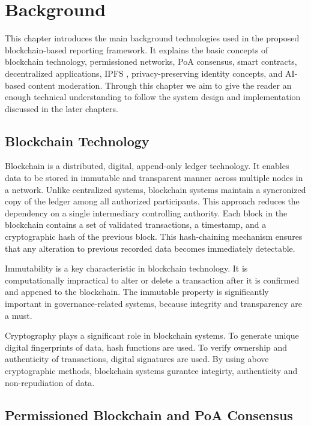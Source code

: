 \chapter{Background}

This chapter introduces the main background technologies used in the proposed blockchain-based reporting framework. It explains the basic concepts of blockchain technology, permissioned networks, PoA consensus, smart contracts, decentralized applications, \ac{IPFS} , privacy-preserving identity concepts, and AI-based content moderation. Through this chapter we aim to give the reader an enough technical understanding to follow the system design and implementation discussed in the later chapters.

\section{Blockchain Technology}


Blockchain is a distributed, digital, append-only ledger technology. It enables data to be stored in immutable and transparent manner across multiple nodes in a network. Unlike centralized systems, blockchain systems maintain a syncronized copy of the ledger among all authorized participants. This approach reduces the dependency on a single intermediary controlling authority. Each block in the blockchain contains a set of validated transactions, a timestamp, and a cryptographic hash of the previous block. This hash-chaining mechanism ensures that any alteration to previous recorded data becomes immediately detectable.

Immutability is a key characteristic in blockchain technology. It is computationally impractical to alter or delete a transaction after it is confirmed and appened to the blockchain. The immutable property is significantly important in governance-related systems, because integrity and transparency are a must. 


Cryptography plays a significant role in blockchain systems. To generate unique digital fingerprints of data, hash functions are used. To verify ownership and authenticity of transactions, digital signatures are used. By using above cryptographic methods, blockchain systems gurantee integirty, authenticity and non-repudiation of data. 

\section{Permissioned Blockchain and PoA Consensus}

